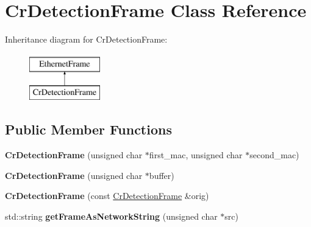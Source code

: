 \hypertarget{classCrDetectionFrame}{\section{Cr\-Detection\-Frame Class Reference}
\label{classCrDetectionFrame}
}
Inheritance diagram for Cr\-Detection\-Frame\-:\begin{figure}[H]
\begin{center}
\leavevmode
\includegraphics[height=2.000000cm]{classCrDetectionFrame}
\end{center}
\end{figure}
\subsection*{Public Member Functions}
\begin{DoxyCompactItemize}
\item 
\hypertarget{classCrDetectionFrame_ae18f2eb2a6342d0760790cc3bb236cf8}{{\bfseries Cr\-Detection\-Frame} (unsigned char $\ast$first\-\_\-mac, unsigned char $\ast$second\-\_\-mac)}\label{classCrDetectionFrame_ae18f2eb2a6342d0760790cc3bb236cf8}

\item 
\hypertarget{classCrDetectionFrame_a770a7b9e5cf99fc4162e1aa557c15374}{{\bfseries Cr\-Detection\-Frame} (unsigned char $\ast$buffer)}\label{classCrDetectionFrame_a770a7b9e5cf99fc4162e1aa557c15374}

\item 
\hypertarget{classCrDetectionFrame_aa402d5ca474162151698e40d51a08c71}{{\bfseries Cr\-Detection\-Frame} (const \hyperlink{classCrDetectionFrame}{Cr\-Detection\-Frame} \&orig)}\label{classCrDetectionFrame_aa402d5ca474162151698e40d51a08c71}

\item 
\hypertarget{classCrDetectionFrame_ab8b90e0e28d53954ee2ef85ee5d9b173}{std\-::string {\bfseries get\-Frame\-As\-Network\-String} (unsigned char $\ast$src)}\label{classCrDetectionFrame_ab8b90e0e28d53954ee2ef85ee5d9b173}

\end{DoxyCompactItemize}
